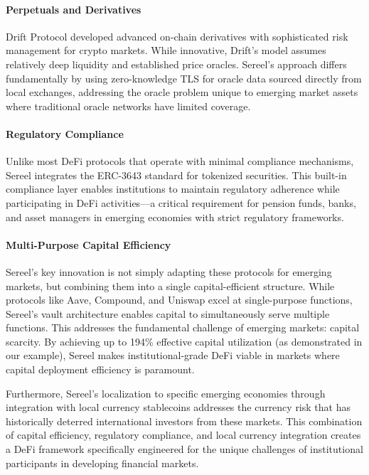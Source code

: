 \documentclass[12pt]{article}
\begin{document}
\paragraph{Perpetuals and Derivatives}
Drift Protocol developed advanced on-chain derivatives with sophisticated risk management for crypto markets. While innovative, Drift's model assumes relatively deep liquidity and established price oracles. Sereel's approach differs fundamentally by using zero-knowledge TLS for oracle data sourced directly from local exchanges, addressing the oracle problem unique to emerging market assets where traditional oracle networks have limited coverage.

\paragraph{Regulatory Compliance}
Unlike most DeFi protocols that operate with minimal compliance mechanisms, Sereel integrates the ERC-3643 standard \citep{erc3643} for tokenized securities. This built-in compliance layer enables institutions to maintain regulatory adherence while participating in DeFi activities—a critical requirement for pension funds, banks, and asset managers in emerging economies with strict regulatory frameworks.

\paragraph{Multi-Purpose Capital Efficiency}
Sereel's key innovation is not simply adapting these protocols for emerging markets, but combining them into a single capital-efficient structure. While protocols like Aave, Compound, and Uniswap excel at single-purpose functions, Sereel's vault architecture enables capital to simultaneously serve multiple functions. This addresses the fundamental challenge of emerging markets: capital scarcity. By achieving up to 194\% effective capital utilization (as demonstrated in our example), Sereel makes institutional-grade DeFi viable in markets where capital deployment efficiency is paramount.

Furthermore, Sereel's localization to specific emerging economies through integration with local currency stablecoins addresses the currency risk that has historically deterred international investors from these markets. This combination of capital efficiency, regulatory compliance, and local currency integration creates a DeFi framework specifically engineered for the unique challenges of institutional participants in developing financial markets.
\end{document}
